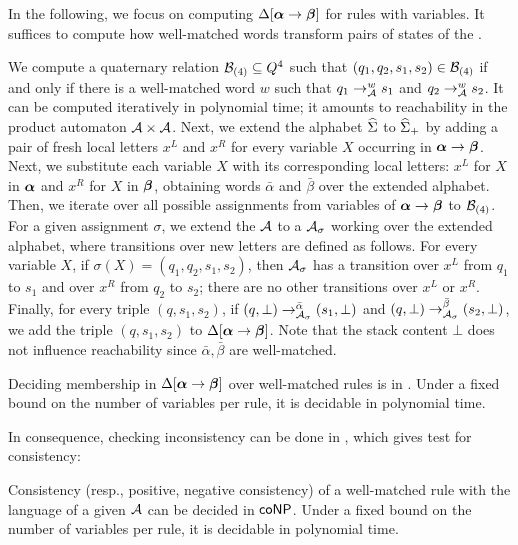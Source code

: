 In the following, we focus on computing $\Delta[\boldsymbol{\alpha} \to \boldsymbol{\beta}]$ for rules with variables. 
It suffices to compute how well-matched words transform pairs of states of the \DVPA.

\newcommand{\lhsInst}{\bar{\alpha}}
\newcommand{\rhsInst}{\bar{\beta}}
We compute a quaternary relation $\mathcal{B}_{(4)} \subseteq Q^4$ such that $(q_1, q_2, s_1, s_2) \in \mathcal{B}_{(4)}$ if and only if there is a well-matched word $w$ such that
$q_1 \rightarrow_{\mathcal{A}}^{w} s_1$ and $q_2 \rightarrow_{\mathcal{A}}^{w} s_2$. 
It can be computed iteratively in polynomial time; it amounts to reachability in the product automaton $\mathcal{A} \times \mathcal{A}$.
Next, we extend the alphabet $\widehat{\Sigma}$ to $\widehat{\Sigma}_+$ by adding a pair of fresh local letters $x^L$ and $x^R$ for every variable $X$ occurring in $\boldsymbol{\alpha} \to \boldsymbol{\beta}$.
Next, we substitute each variable $X$ with its corresponding local letters: $x^L$ for $X$ in $\boldsymbol{\alpha}$ and $x^R$ for $X$ in $\boldsymbol{\beta}$, obtaining words $\lhsInst$ and $\rhsInst$ over the extended alphabet. 
Then, we iterate over all possible assignments from variables of $\boldsymbol{\alpha} \to \boldsymbol{\beta}$ to $\mathcal{B}_{(4)}$. 
For a given assignment $\sigma$, we extend the \DVPA $\mathcal{A}$ to a \VPA $\mathcal{A}_{\sigma}$ working over the extended alphabet, where transitions over new letters are defined as follows.
For every variable $X$, if $\sigma(X) = (q_1, q_2, s_1, s_2)$, then
$\mathcal{A}_{\sigma}$ has a transition over $x^L$ from $q_1$ to $s_1$ and over $x^R$ from $q_2$ to $s_2$; there are no other transitions over $x^L$ or $x^R$.
Finally, %
for every triple $(q,s_1, s_2)$, if $(q,\bot) \trans{\autPlus}{\lhsInst} (s_1,\bot)$ and $(q,\bot) \trans{\autPlus}{\rhsInst} (s_2,\bot)$, we add the triple $(q,s_1, s_2)$  to $\Delta[\boldsymbol{\alpha} \to \boldsymbol{\beta}]$.
Note that the stack content $\bot$ does not influence reachability since $\lhsInst, \rhsInst$ are well-matched.


\begin{lemma}
Deciding membership in $\Delta[\boldsymbol{\alpha} \to \boldsymbol{\beta}]$ over well-matched rules is in \NP.
Under a fixed bound on the number of variables per rule, it is decidable in polynomial time.
\end{lemma}

In consequence, checking inconsistency can be done in \NP, which gives \coNP test for consistency:

\begin{theorem}
Consistency (resp., positive, negative consistency) of a well-matched rule with the language of a given \DVPA $\mathcal{A}$ can be decided in $\textsf{coNP}$.
Under a fixed bound on the number of variables per rule, it is decidable in polynomial time.
\end{theorem}


